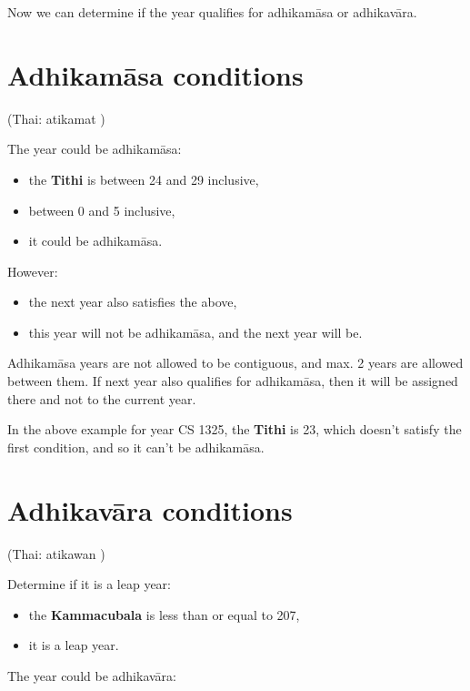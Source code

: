 \documentclass[11pt,oneside]{memoir-article}
\begin{document}
Now we can determine if the year qualifies for adhikamāsa or adhikavāra.

\section{Adhikamāsa conditions}
\label{sec-5-3}
\label{adhikamasa-years}

(Thai: atikamat )

The year could be adhikamāsa:

\begin{itemize}
\item {} the \textbf{Tithi} is between 24 and 29 inclusive,
\item {} between 0 and 5 inclusive,
\item {} it could be adhikamāsa.
\end{itemize}

However:

\begin{itemize}
\item {} the next year also satisfies the above,
\item {} this year will not be adhikamāsa, and the next year will be.
\end{itemize}

Adhikamāsa years are not allowed to be contiguous, and max. 2 years are allowed
between them. If next year also qualifies for adhikamāsa, then it will be
assigned there and not to the current year.

In the above example for year CS 1325, the \textbf{Tithi} is 23, which doesn't satisfy
the first condition, and so it can't be adhikamāsa.

\section{Adhikavāra conditions}
\label{sec-5-4}
\label{adhikavara-years}

(Thai: atikawan )

Determine if it is a leap year:

\begin{itemize}
\item {} the \textbf{Kammacubala} is less than or equal to 207,
\item {} it is a leap year.
\end{itemize}

The year could be adhikavāra:
\end{document}
